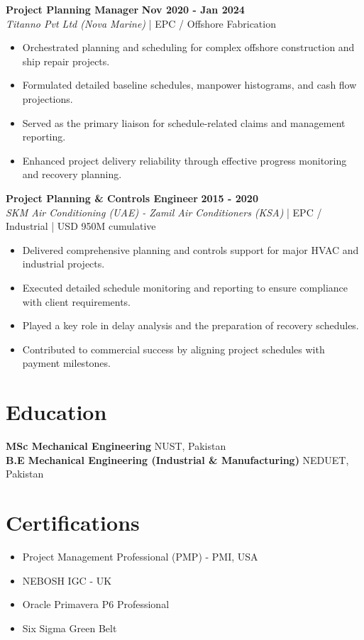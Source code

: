 \documentclass[11pt,a4paper]{article}
\begin{document}
\noindent \textbf{\large Project Planning Manager} \hfill \textbf{\color{awesome-blue}Nov 2020 - Jan 2024}\\
\textit{Titanno Pvt Ltd (Nova Marine)} | EPC / Offshore Fabrication\\
\begin{itemize}
    \item Orchestrated planning and scheduling for complex offshore construction and ship repair projects.
    \item Formulated detailed baseline schedules, manpower histograms, and cash flow projections.
    \item Served as the primary liaison for schedule-related claims and management reporting.
    \item Enhanced project delivery reliability through effective progress monitoring and recovery planning.
\end{itemize}

\noindent \textbf{\large Project Planning \& Controls Engineer} \hfill \textbf{\color{awesome-blue}2015 - 2020}\\
\textit{SKM Air Conditioning (UAE)  -  Zamil Air Conditioners (KSA)} | EPC / Industrial | USD 950M cumulative\\
\begin{itemize}
    \item Delivered comprehensive planning and controls support for major HVAC and industrial projects.
    \item Executed detailed schedule monitoring and reporting to ensure compliance with client requirements.
    \item Played a key role in delay analysis and the preparation of recovery schedules.
    \item Contributed to commercial success by aligning project schedules with payment milestones.
\end{itemize}


\section{Education}
\noindent \textbf{MSc Mechanical Engineering} \hfill NUST, Pakistan\\
\noindent \textbf{B.E Mechanical Engineering (Industrial \& Manufacturing)} \hfill NEDUET, Pakistan\\

\section{Certifications}
\begin{itemize}[noitemsep]
    \item Project Management Professional (PMP) - PMI, USA
    \item NEBOSH IGC - UK
    \item Oracle Primavera P6 Professional
    \item Six Sigma Green Belt
\end{itemize}
\end{document}
